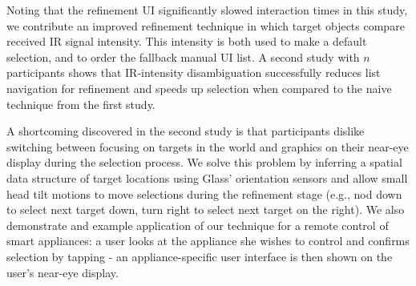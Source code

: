 Noting that the refinement UI significantly slowed interaction times in this study, we contribute an improved refinement technique in which target objects compare received IR signal intensity. This intensity is both used to make a default selection, and to order the fallback manual UI list. A second study with $n$ participants shows that IR-intensity disambiguation successfully reduces list navigation for refinement and speeds up selection when compared to the naive technique from the first study.

A shortcoming discovered in the second study is that participants dislike switching between focusing on targets in the world and graphics on their near-eye display during the selection process. We solve this problem by inferring a spatial data structure of target locations using Glass' orientation sensors and allow small head tilt motions to move selections during the refinement stage (e.g., nod down to select next target down, turn right to select next target on the right).
We also demonstrate and example application of our technique for a remote control of smart appliances: a user looks at the appliance she wishes to control and confirms selection by tapping - an appliance-specific user interface is then shown on the user's near-eye display.





